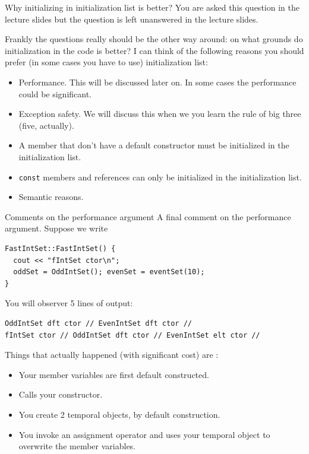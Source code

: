 \begin{frame}{Why initializing in initialization list is better?}
You are asked this question in the lecture slides but the question is left unanswered in the lecture slides.

\vspace{0.1in}
Frankly the questions really should be the other way around: on what grounds do initialization in the code is better? I can think of the following reasons you should prefer (in some cases you have to use) initialization list:
\begin{itemize}
	\item Performance. This will be discussed later on. In some cases the performance could be significant.
	\item Exception safety. We will discuss this when we you learn the rule of big three (five, actually).
	\item A member that don't have a default constructor must be initialized in the initialization list.
	\item \texttt{const} members and references can only be initialized in the initialization list.
	\item Semantic reasons.
\end{itemize} 
\end{frame}

\begin{frame}[fragile]{Comments on the performance argument}
A final comment on the performance argument. Suppose we write 
\begin{verbatim}
FastIntSet::FastIntSet() {
  cout << "fIntSet ctor\n";
  oddSet = OddIntSet(); evenSet = eventSet(10);
}
\end{verbatim}
You will observer 5 lines of output:
\begin{verbatim}
OddIntSet dft ctor // EvenIntSet dft ctor //
fIntSet ctor // OddIntSet dft ctor // EvenIntSet elt ctor //
\end{verbatim}
Things that actually happened (with significant cost) are :
\begin{itemize}
	\item Your member variables are first default constructed.
	\item Calls your constructor.
	\item You create 2 temporal objects, by default construction.
	\item You invoke an assignment operator and uses your temporal object to overwrite the member variables. 
\end{itemize}

\end{frame}